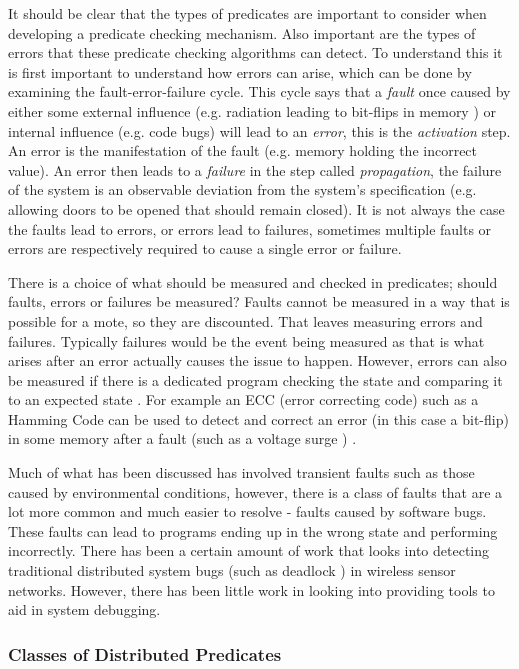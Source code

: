 It should be clear that the types of predicates are important to consider when developing a predicate checking mechanism. Also important are the types of errors that these predicate checking algorithms can detect. To understand this it is first important to understand how errors can arise, which can be done by examining the fault-error-failure cycle. This cycle says that a \emph{fault} once caused by either some external influence (e.g. radiation leading to bit-flips in memory \cite{1017791}) or internal influence (e.g. code bugs) will lead to an \emph{error}, this is the \emph{activation} step. An error is the manifestation of the fault (e.g. memory holding the incorrect value). An error then leads to a \emph{failure} in the step called \emph{propagation}, the failure of the system is an observable deviation from the system's specification (e.g. allowing doors to be opened that should remain closed). It is not always the case the faults lead to errors, or errors lead to failures, sometimes multiple faults or errors are respectively required to cause a single error or failure. \cite{1335465}

There is a choice of what should be measured and checked in predicates; should faults, errors or failures be measured? Faults cannot be measured \cite{?} in a way that is possible for a mote, so they are discounted. That leaves measuring errors and failures. Typically failures would be the event being measured \cite{?} as that is what arises after an error actually causes the issue to happen. However, errors can also be measured if there is a dedicated program checking the state and comparing it to an expected state \cite{?}. For example an ECC (error correcting code) such as a Hamming Code can be used to detect and correct an error (in this case a bit-flip) in some memory after a fault (such as a voltage surge ) \cite{hamming1950error}.

Much of what has been discussed has involved transient faults such as those caused by environmental conditions, however, there is a class of faults that are a lot more common and much easier to resolve - faults caused by software bugs. These faults can lead to programs ending up in the wrong state and performing incorrectly. There has been a certain amount of work that looks into detecting traditional distributed system bugs (such as deadlock \cite{5587352,5284172}) in wireless sensor networks. However, there has been little work in looking into providing tools to aid in system debugging.

\subsubsection*{Classes of Distributed Predicates}

